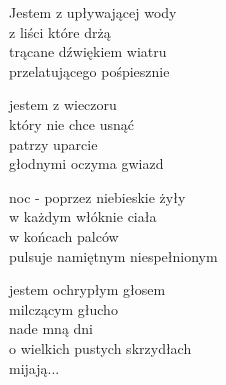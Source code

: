 
\begin{text}
    Jestem z upływającej wody\\
    z liści które drżą\\
    trącane dźwiękiem wiatru\\
    przelatującego pośpiesznie

    jestem z wieczoru\\
    który nie chce usnąć\\
    patrzy uparcie\\
    głodnymi oczyma gwiazd

    noc - poprzez niebieskie żyły\\
    w każdym włóknie ciała\\
    w końcach palców\\
    pulsuje namiętnym niespełnionym

    jestem ochrypłym głosem\\
    milczącym głucho\\
    nade mną dni\\
    o wielkich pustych skrzydłach\\
    mijają...
\end{text}
\begin{chord}

\end{chord}